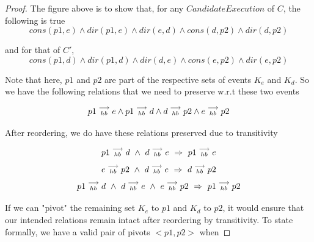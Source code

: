 \begin{proof}
        The figure above is to show that, for any $Candidate Execution$ of $C$, the following is true
        \[
            cons(p1,e) \wedge dir(p1,e) \wedge dir(e,d) \wedge cons(d,p2) \wedge dir(d,p2)
        \]
        
        and for that of $C'$,
        \[
            cons(p1,d) \wedge dir(p1,d) \wedge dir(d,e) \wedge cons(e,p2) \wedge dir(e,p2) 
        \]
        
        Note that here, $p1$ and $p2$ are part of the respective sets of events $K_e$ and $K_d$. So we have the following relations that we need to preserve w.r.t these two events
        
        \[
            p1\stackrel{\longrightarrow}{_{hb}}e \wedge p1\stackrel{\longrightarrow}{_{hb}}d \wedge d\stackrel{\longrightarrow}{_{hb}}p2 \wedge e\stackrel{\longrightarrow}{_{hb}}p2
        \]
        
        After reordering, we do have these relations preserved due to transitivity
        
        \[
            \reln{p1}{hb}{d} \ \wedge \ \reln{d}{hb}{e} \ \Rightarrow \ \reln{p1}{hb}{e}
        \]
        \[
            \reln{e}{hb}{p2} \ \wedge \ \reln{d}{hb}{e} \ \Rightarrow \ \reln{d}{hb}{p2}
        \]
        \[
            \reln{p1}{hb}{d} \ \wedge \ \reln{d}{hb}{e} \ \wedge \ \reln{e}{hb}{p2} \ \Rightarrow \ \reln{p1}{hb}{p2}
        \]
        
        
        
        
        
        If we can "pivot" the remaining set $K_e$ to $p1$ and $K_d$ to $p2$, it would ensure that our intended relations remain intact after reordering by transitivity. To state formally, we have a valid pair of pivots $<p1,p2>$ when 
        

\end{proof}
